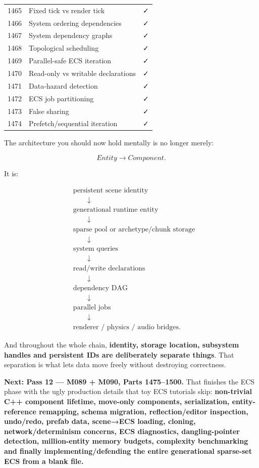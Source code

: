 {\begin{longtable}[]{@{}rll@{}}
1465 & Fixed tick vs render tick & ✓ \\
1466 & System ordering dependencies & ✓ \\
1467 & System dependency graphs & ✓ \\
1468 & Topological scheduling & ✓ \\
1469 & Parallel-safe ECS iteration & ✓ \\
1470 & Read-only vs writable declarations & ✓ \\
1471 & Data-hazard detection & ✓ \\
1472 & ECS job partitioning & ✓ \\
1473 & False sharing & ✓ \\
1474 & Prefetch/sequential iteration & ✓ \\
\end{longtable}
}

The architecture you should now hold mentally is no longer merely:

\[
Entity\rightarrow Component.
\]

It is:

\[
\boxed{
\begin{aligned}
&\text{persistent scene identity}\\
&\qquad\downarrow\\
&\text{generational runtime entity}\\
&\qquad\downarrow\\
&\text{sparse pool or archetype/chunk storage}\\
&\qquad\downarrow\\
&\text{system queries}\\
&\qquad\downarrow\\
&\text{read/write declarations}\\
&\qquad\downarrow\\
&\text{dependency DAG}\\
&\qquad\downarrow\\
&\text{parallel jobs}\\
&\qquad\downarrow\\
&\text{renderer / physics / audio bridges}.
\end{aligned}
}
\]

And throughout the whole chain, \textbf{identity, storage location, subsystem handles and persistent IDs are deliberately separate things}. That separation is what lets data move freely without destroying correctness.

\textbf{Next: Pass 12 --- M089 + M090, Parts 1475--1500.} That finishes the ECS phase with the ugly production details that toy ECS tutorials skip: \textbf{non-trivial C++ component lifetime, move-only components, serialization, entity-reference remapping, schema migration, reflection/editor inspection, undo/redo, prefab data, scene→ECS loading, cloning, network/determinism concerns, ECS diagnostics, dangling-pointer detection, million-entity memory budgets, complexity benchmarking and finally implementing/defending the entire generational sparse-set ECS from a blank file.}

